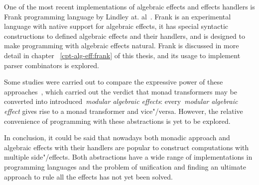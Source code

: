 One of the most recent implementations of algebraic effects and effects handlers
is Frank programming language by Lindley at. al~\cite{DBLP:conf/popl/LindleyMM17}.
Frank is an experimental language
with native support for algebraic effects, it has special syntactic constructions
to defined algebraic effects and their handlers, and is designed to make programming
with algebraic effects natural. Frank is discussed in more detail in chapter
~\ref{cpt-alg-eff:frank} of this thesis, and its usage to implement parser
combinators is explored.

Some studies were carried out to compare the expressive power of these
approaches~\cite{DBLP:journals/corr/ForsterKLP16}, which carried out the verdict
that monad transformers may be converted into introduced~\emph{modular algebraic
effects}: every~\emph{modular algebraic effect} gives rise to a monad transformer
and vice"/versa. However, the relative convenience of programming with these abstractions
is yet to be explored.

In conclusion, it could be said that nowadays both monadic approach and algebraic
effects with their handlers are popular to construct computations with multiple
side"/effects. Both abstractions have a wide range of implementations in programming
languages and the problem of unification and finding an ultimate approach to rule
all the effects has not yet been solved.
